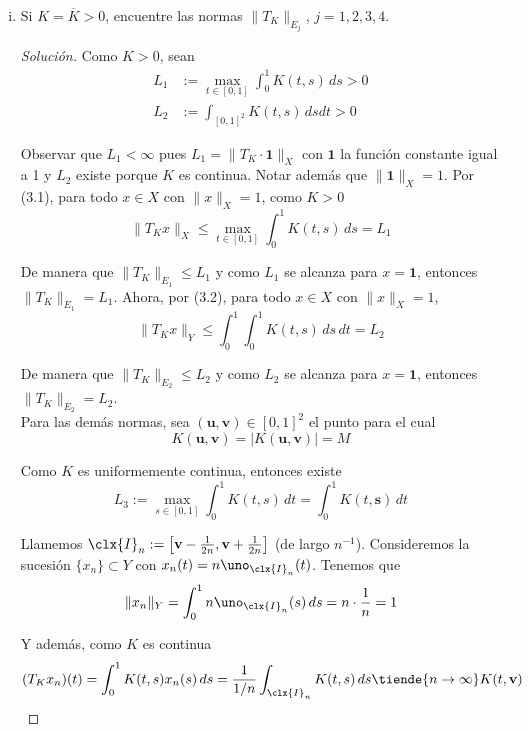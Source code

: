 \documentclass[duedate = 11 de Septiembre, 
			ramo = An\'alisis Funcional, 
			doctype = Tarea 1,
			semester = 2,
			year = 2017]{tarea}
\begin{document}
\begin{enumerate}[(i)]
\begin{proof}[Solución]
\begin{proof}
	Luego $T_{K}$ es acotada y $\|T_{K}\|_{E_{4}} \leq M$
	\end{proof}
	\end{proof}

	\newpage
	\item Si $K = \overline{K} > 0$, encuentre las normas $\|T_{K}\|_{E_{j}}$, $j = 1,2,3,4$.
	
	\begin{proof}[Solución] Como $K > 0$, sean
		\begin{align*}
			L_{1}	&:=	\max_{t \in [0,1]} \int_{0}^{1} K(t,s) \, ds > 0	\\
			L_{2}	&:=	\int_{[0,1]^{2}} K(t,s) \, ds dt > 0	
		\end{align*}
		
	Observar que $L_{1} < \infty$ pues $L_{1} = \|T_{K} \cdot \mathbf{1}\|_{X}$ con $\mathbf{1}$ la función constante igual a 1 y $L_{2}$ existe porque $K$ es continua. Notar además que $\|\mathbf{1}\|_{X} = 1$. Por (3.1), para todo $x \in X$ con $\|x\|_{X} = 1$, como $K > 0$
		$$\|T_{K}x\|_{X} \leq \max_{t \in [0,1]} \int_{0}^{1} K(t,s) \, ds = L_{1}$$
		
	De manera que $\|T_{K}\|_{E_{1}} \leq L_{1}$ y como $L_{1}$ se alcanza para $x = \mathbf{1}$, entonces $\|T_{K}\|_{E_{1}} = L_{1}$. Ahora, por (3.2), para todo $x \in X$ con $\|x\|_{X} = 1$,
		$$\|T_{K}x\|_{Y} \leq \int_{0}^{1} \int_{0}^{1} K(t,s) \, ds \, dt = L_{2}$$
	
	De manera que $\|T_{K}\|_{E_{2}} \leq L_{2}$ y como $L_{2}$ se alcanza para $x= \mathbf{1}$, entonces $\|T_{K}\|_{E_{2}} = L_{2}$.	\\
	
	Para las demás normas, sea $(\mathbf{u}, \mathbf{v}) \in [0,1]^{2}$ el punto para el cual
		$$K(\mathbf{u}, \mathbf{v}) = |K(\mathbf{u}, \mathbf{v})| = M$$
	
	Como $K$ es uniformemente continua, entonces existe
		$$L_{3} := \max_{s \in [0,1]} \int_{0}^{1} K(t,s) \, dt = \int_{0}^{1} K(t,\mathbf{s}) \, dt$$
	
	Llamemos $\clx{I}_{n} := \left[\mathbf{v} - \frac{1}{2n}, \mathbf{v} + \frac{1}{2n}\right]$ (de largo $n^{-1}$). Consideremos la sucesión $\{x_{n}\} \subset Y$ con $x_{n}(t) = n\uno_{\clx{I}_{n}}(t)$. Tenemos que
		$$\|x_{n}\|_{Y} = \int_{0}^{1} n \uno_{\clx{I}_{n}}(s) \,ds = n \cdot \frac{1}{n} = 1$$
	
	Y además, como $K$ es continua
		$$(T_{K}x_{n})(t) = \int_{0}^{1} K(t,s)x_{n}(s) \, ds = \frac{1}{1/n} \int_{\clx{I}_{n}} K(t,s) \, ds \tiende{n \to \infty} K(t,\mathbf{v})$$
	

\end{proof}
\end{enumerate}
\end{document}
